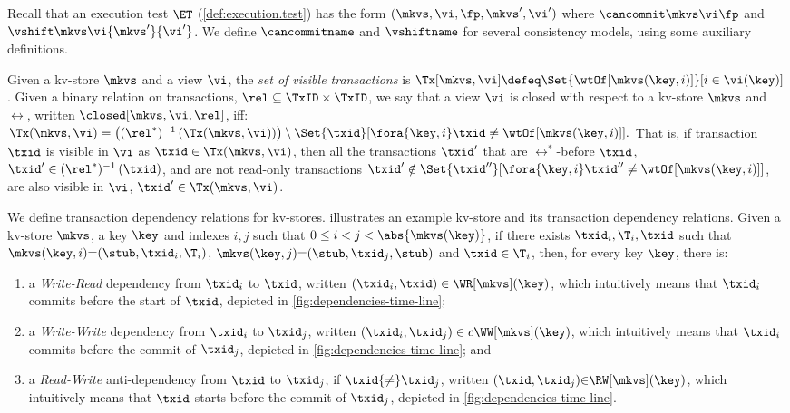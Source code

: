 Recall that an  execution test \(\ET\) (\cref{def:execution.test})
has the form \((\mkvs,\vi, \fp, \allowbreak \mkvs', \vi')\) 
where  \(\cancommit \mkvs \vi \fp\) and \(\vshift \mkvs \vi {\mkvs'} {\vi'}\). 
We define \(\cancommitname\) and \(\vshiftname\) for several consistency
models, using some auxiliary definitions. 


Given a kv-store \(\mkvs\) and a view \(\vi\), the {\em set of visible
transactions} is
\( \Tx[\mkvs, \vi]  \defeq \Set{\wtOf[\mkvs(\key, i)] }[ i \in \vi(\key)] \).
Given a binary relation on transactions, \(\rel \subseteq \TxID \times \TxID\),
we say that a view \(\vi\) is closed with respect to a kv-store \(\mkvs\) and \(\rel\), written \(\closed[\mkvs,\vi,\rel]\), iff:  
\(
	\Tx(\mkvs, \vi) = 
	\left( (\rel^*)^{-1} \left( \Tx(\mkvs, \vi) \right) \right) \setminus \Set{\txid }[ \fora{\key,i} \txid \neq \wtOf[\mkvs(\key,i)] ] .
\)
That is, if transaction \(\txid\) is visible in \(\vi\) as \( \txid \in \Tx(\mkvs, \vi) \),
then all the transactions \( \txid'  \) that are \(\rel^*\)-before \(\txid\), \ie \(\txid' \in (\rel^*)^{-1} \left( \txid \right)\),
and are not read-only transactions \( \txid' \notin \Set{\txid'' }[ \fora{\key,i} \txid'' \neq \wtOf[\mkvs(\key,i)] ] \),
are also visible in \(\vi\), \ie \( \txid' \in \Tx(\mkvs, \vi) \).

We define transaction dependency relations for kv-stores.
 illustrates an example kv-store and
its transaction dependency relations.
Given a kv-store \(\mkvs\), a key \(\key\) and 
indexes \(i,j\) such that  \(0 \leq i < j < \abs{ \mkvs(\key) }\), 
if there exists \(\txid_i, \T_i, \txid\) such that 
\(\mkvs(\key, i)  {=} (\stub, \txid_{i}, \T_{i})\), \(\mkvs(\key,j) {=} (\stub, \txid_{j}, \stub)\)
and \(\txid \in \T_{i}\), 
then, for every key \( \key \), there is:

\begin{enumerate} 
\item a \emph{Write-Read} dependency from \(\txid_{i}\) to \(\txid\), written \((\txid_{i},\txid) \in \WR[\mkvs](\key)\),
which  intuitively means that \( \txid_{i} \) commits before the start of \( \txid \), depicted in \cref{fig:dependencies-time-line};
\item a \emph{Write-Write} dependency from \(\txid_{i}\) to \(\txid_{j}\), 
written \((\txid_{i},\txid_{j}) \in c\WW[\mkvs](\key) \),
which intuitively means that \( \txid_{i} \) commits before the commit of \( \txid_j \), depicted in \cref{fig:dependencies-time-line}; and 
\item a \emph{Read-Write} anti-dependency from \(\txid\) to \(\txid_{j}\), if 
\(\txid {\neq} \txid_{j}\), written \((\txid,\txid_j) {\in} \RW[\mkvs](\key)\),
which intuitively  means that \( \txid \) starts before the commit of \( \txid_j \), depicted in \cref{fig:dependencies-time-line}.
\end{enumerate}

